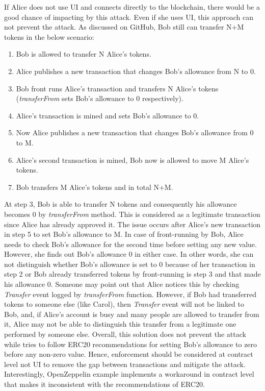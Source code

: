 \noindent If Alice does not use UI and connects directly to the blockchain, there would be a good chance of impacting by this attack. Even if she uses UI, this approach can not prevent the attack. As discussed on GitHub\cite{Ref14}, Bob still can transfer N+M tokens in the below scenario:
\begin{enumerate}
	\item Bob is allowed to transfer N Alice’s tokens.
	\item Alice publishes a new transaction that changes Bob’s allowance from N to 0.
	\item Bob front runs Alice’s transaction and transfers N Alice’s tokens (\textit{transferFrom} sets Bob’s allowance to 0 respectively).
	\item Alice’s transaction is mined and sets Bob’s allowance to 0.
	\item Now Alice publishes a new transaction that changes Bob’s allowance from 0 to M.
	\item Alice’s second transaction is mined, Bob now is allowed to move M Alice’s tokens.
	\item Bob transfers M Alice’s tokens and in total N+M.\newline
\end{enumerate}
At step 3, Bob is able to transfer N tokens and consequently his allowance becomes 0 by \textit{transferFrom} method. This is considered as a legitimate transaction since Alice has already approved it. The issue occurs after Alice’s new transaction in step 5 to set Bob's allowance to M. In case of front-running by Bob, Alice needs to check Bob’s allowance for the second time before setting any new value. However, she finds out Bob’s allowance 0 in either case. In other words, she can not distinguish whether Bob’s allowance is set to 0 because of her transaction in step 2 or Bob already transferred tokens by front-running is step 3 and that made his allowance 0. Someone may point out that Alice notices this by checking \textit{Transfer} event logged by \textit{transferFrom} function. However, if Bob had transferred tokens to someone else (like Carol), then \textit{Transfer} event will not be linked to Bob, and, if Alice’s account is busy and many people are allowed to transfer from it, Alice may not be able to distinguish this transfer from a legitimate one performed by someone else. Overall, this solution does not prevent the attack while tries to follow ERC20 recommendations for setting Bob’s allowance to zero before any non-zero value. Hence, enforcement should be considered at contract level not UI to remove the gap between transactions and mitigate the attack. Interestingly, OpenZeppelin example implements a workaround in contract level that makes it inconsistent with the recommendations of ERC20. 

